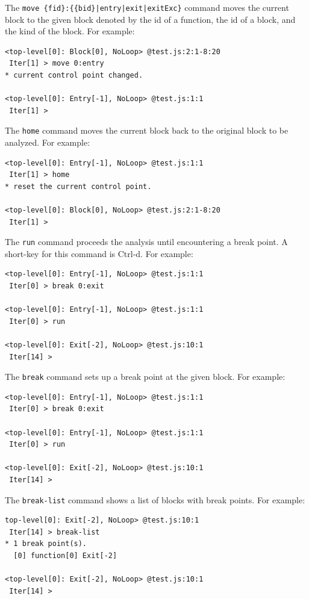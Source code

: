 \medskip
The \verb!move {fid}:{{bid}|entry|exit|exitExc}! command
moves the current block to the given block denoted by the id of a function,
the id of a block, and the kind of the block.  For example:
{\small
\begin{verbatim}
<top-level[0]: Block[0], NoLoop> @test.js:2:1-8:20
 Iter[1] > move 0:entry
* current control point changed.

<top-level[0]: Entry[-1], NoLoop> @test.js:1:1
 Iter[1] >
\end{verbatim}
}

\medskip
The \verb!home! command moves the current block back to the original
block to be analyzed.  For example:
{\small
\begin{verbatim}
<top-level[0]: Entry[-1], NoLoop> @test.js:1:1
 Iter[1] > home
* reset the current control point.

<top-level[0]: Block[0], NoLoop> @test.js:2:1-8:20
 Iter[1] >
\end{verbatim}
}

\medskip
The \verb!run! command proceeds the analysis until encountering a break
point.  A short-key for this command is Ctrl-d.  For example:
{\small
\begin{verbatim}
<top-level[0]: Entry[-1], NoLoop> @test.js:1:1
 Iter[0] > break 0:exit

<top-level[0]: Entry[-1], NoLoop> @test.js:1:1
 Iter[0] > run

<top-level[0]: Exit[-2], NoLoop> @test.js:10:1
 Iter[14] >
\end{verbatim}
}

\medskip
The \verb!break! command sets up a break point at the given block.
For example:
{\small
\begin{verbatim}
<top-level[0]: Entry[-1], NoLoop> @test.js:1:1
 Iter[0] > break 0:exit

<top-level[0]: Entry[-1], NoLoop> @test.js:1:1
 Iter[0] > run

<top-level[0]: Exit[-2], NoLoop> @test.js:10:1
 Iter[14] >
\end{verbatim}
}

\medskip
The \verb!break-list! command shows a list of blocks with
break points.  For example:
{\small
\begin{verbatim}
top-level[0]: Exit[-2], NoLoop> @test.js:10:1
 Iter[14] > break-list
* 1 break point(s).
  [0] function[0] Exit[-2]

<top-level[0]: Exit[-2], NoLoop> @test.js:10:1
 Iter[14] >
\end{verbatim}
}

